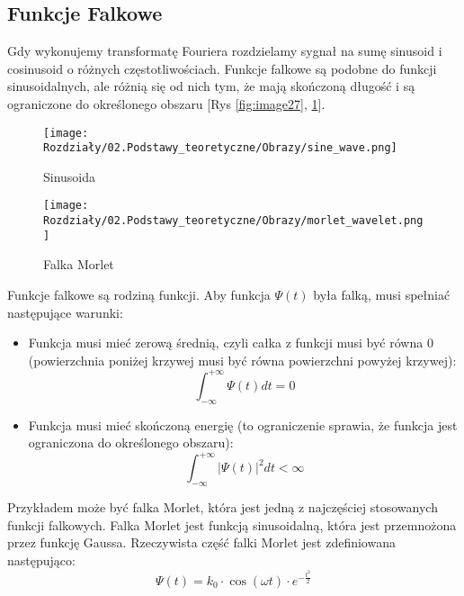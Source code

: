 \subsection*{Funkcje Falkowe}

Gdy wykonujemy transformatę Fouriera rozdzielamy sygnał na sumę sinusoid i cosinusoid o różnych częstotliwościach. Funkcje falkowe są podobne do funkcji sinusoidalnych, ale różnią się od nich tym, że mają skończoną długość i są ograniczone do określonego obszaru [Rys \ref{fig:image27}, \ref{fig:image28}].

\begin{figure}[H]
    \centering
    \begin{minipage}[t]{0.3\linewidth}
        \texttt{[image: Rozdziały/02.Podstawy\_teoretyczne/Obrazy/sine\_wave.png]}
        \caption{Sinusoida}
        \label{fig:image27}
    \end{minipage}
    \hspace{0.5cm}
    \begin{minipage}[t]{0.3\linewidth}
        \texttt{[image: Rozdziały/02.Podstawy\_teoretyczne/Obrazy/morlet\_wavelet.png]}
        \caption{Falka Morlet}
        \label{fig:image28}
    \end{minipage}
\end{figure}


Funkcje falkowe są rodziną funkcji. Aby funkcja $\Psi(t)$ była falką, musi spełniać następujące warunki:
\begin{itemize}
    \item Funkcja musi mieć zerową średnią, czyli całka z funkcji musi być równa 0 (powierzchnia poniżej krzywej musi być równa powierzchni powyżej krzywej):
        \begin{equation}
            \int_{-\infty}^{+\infty} \Psi(t) d t=0
        \end{equation}
    \item Funkcja musi mieć skończoną energię (to ograniczenie sprawia, że funkcja jest ograniczona do określonego obszaru):
        \begin{equation}
            \int_{-\infty}^{+\infty}|\Psi(t)|^{2} d t<\infty
        \end{equation}
\end{itemize}

Przykładem może być falka Morlet, która jest jedną z najczęściej stosowanych funkcji falkowych. Falka Morlet jest funkcją sinusoidalną, która jest przemnożona przez funkcję Gaussa. Rzeczywista część falki Morlet jest zdefiniowana następująco:
\begin{equation}
    \Psi(t)=k_0 \cdot \cos (\omega t) \cdot e^{-\frac{t^2}{2}}
\end{equation}

